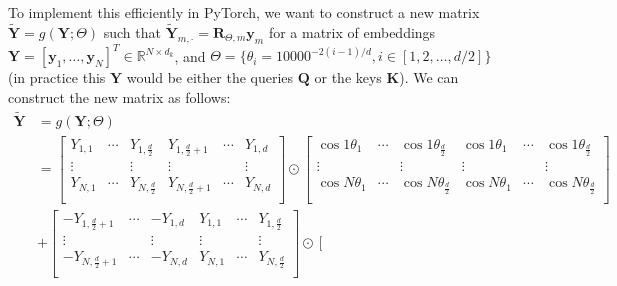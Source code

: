 \documentclass[11pt,addpoints,answers]{exam}
\newcommand{\Rb}{\mathbb{R}}
\newcommand{\yv}{\mathbf{y}}
\newcommand{\Kv}{\mathbf{K}}
\newcommand{\Qv}{\mathbf{Q}}
\newcommand{\Rv}{\mathbf{R}}
\newcommand{\Yv}{\mathbf{Y}}
\begin{document}
\begin{questions}
    To implement this efficiently in PyTorch, we want to construct a new matrix $\tilde{\Yv} = g(\Yv; \Theta)$ such that $\tilde{\Yv}_{m, \cdot} = \Rv_{\Theta,m} \yv_m$ for a matrix of embeddings $\Yv = [\yv_1, \ldots, \yv_N]^T \in \Rb^{N \times d_k}$, and $\Theta = \{\theta_i = 10000^{-2(i-1)/d}, i \in [1, 2, \ldots, d/2]\}$ (in practice this $\Yv$ would be either the queries $\Qv$ or the keys $\Kv$). We can construct the new matrix as follows:
    {\small 
    \begin{align*}
        \tilde{\Yv} &= g(\Yv; \Theta) \\
        &= \left[ \begin{array}{ccc|ccc} 
            Y_{1,1} & \cdots & Y_{1,\frac{d}{2}} & Y_{1,\frac{d}{2}+1} & \cdots & Y_{1,d} \\
            \vdots & & \vdots & \vdots & & \vdots \\
            Y_{N,1} & \cdots & Y_{N,\frac{d}{2}} & Y_{N,\frac{d}{2}+1} & \cdots & Y_{N,d} \\
        \end{array} \right] 
        \odot
        \left[ \begin{array}{ccc|ccc} 
            \cos 1 \theta_1 & \cdots & \cos 1 \theta_{\frac{d}{2}} & \cos 1 \theta_1 & \cdots & \cos 1 \theta_{\frac{d}{2}} \\
            \vdots & & \vdots & \vdots & & \vdots \\
            \cos N \theta_1 & \cdots & \cos N \theta_{\frac{d}{2}} & \cos N \theta_1 & \cdots & \cos N \theta_{\frac{d}{2}} \\
        \end{array} \right] 
        \\
        &+\left[ \begin{array}{ccc|ccc} 
            -Y_{1,\frac{d}{2}+1} & \cdots & -Y_{1,d} & Y_{1,1} & \cdots & Y_{1,\frac{d}{2}} \\
            \vdots & & \vdots & \vdots & & \vdots \\
            -Y_{N,\frac{d}{2}+1} & \cdots & -Y_{N,d} & Y_{N,1} & \cdots & Y_{N,\frac{d}{2}}  \\
        \end{array} \right] 
        \odot
        \left[ \begin{array}{ccc|ccc} 

\end{array}
\end{align*}}
\end{questions}
\end{document}
